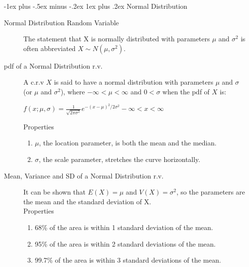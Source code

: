 \documentclass[10pt,landscape]{article}
\makeatletter
\renewcommand{\subsubsection}{\@startsection{subsubsection}{3}{0mm}%
                                {-1ex plus -.5ex minus -.2ex}%
                                {1ex plus .2ex}%
                                {\normalfont\small\bfseries}}
\makeatother
\begin{document}
\begin{multicols}{3}
\subsubsection{Normal Distribution}
\begin{description}
   \item[Normal Distribution Random Variable] The statement that X is normally distributed with parameters $\mu$ and $\sigma^2$ is often abbreviated $X \sim N(\mu,\sigma^2).$
  \item[pdf of a Normal Distribution r.v.] A c.r.v $X$ is said to have a normal distribution with parameters $\mu$ and $\sigma$ (or $\mu$ and $\sigma^2$), where $-\infty < \mu < \infty$ and $0 < \sigma$ when the pdf of $X$ is:
  \begin{center}
  $f(x; \mu, \sigma) = \frac{1}{\sqrt{2\pi\sigma^2}}e^{-(x-\mu)^2/2\sigma^2} -\infty < x < \infty$
  \end{center}
  Properties
  \begin{enumerate}
    \item $\mu$, the location parameter, is both the mean and the median.
    \item $\sigma$, the scale parameter, stretches the curve horizontally.
  \end{enumerate}
  \item[Mean, Variance and SD of a Normal Distribution r.v.] It can be shown that $E(X) = \mu$ and $V(X) = \sigma^2$, so the parameters are the mean and the standard deviation of X.\\
  Properties
  \begin{enumerate}
    \item 68\% of the area is within 1 standard deviation of the mean.
    \item 95\% of the area is within 2 standard deviations of the mean.
    \item 99.7\% of the area is within 3 standard deviations of the mean.
  \end{enumerate}


\end{description}
\end{multicols}
\end{document}

